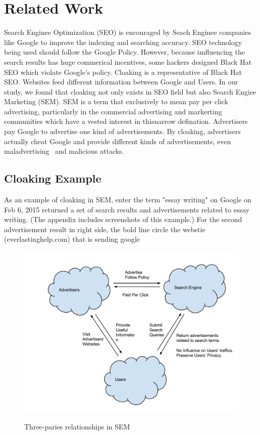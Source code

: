 \section{Related Work}
\label{s:related-work}

Search Enginee Optimization (SEO) is encouraged by Seach Enginee companies like Google to improve the indexing and searching accuracy. SEO technology being used should follow the Google Policy. However, because imfluencing the search results has huge commerical incentives, some hackers designed Black Hat SEO which violate Google's policy. Cloaking is a representative of Black Hat SEO. Websites feed different information between Google and Users. In our study, we found that cloaking not only exists in SEO field but also Search Engiee Marketing (SEM). SEM is a term that exclusively to mean pay per click advertising, particularly in the commercial advertising and markerting communities which have a vested interest in thisnarrow defination. Advertisers pay Google to advertise one kind of advertisements. By cloaking, advertisers actually cheat Google and provide different kinds of advertisements, even maladvertising~\cite{Li:2012:KYE:2382196.2382267} and malicious attacks. 

\subsection{Cloaking Example}
As an example of cloaking in SEM, enter the term "essay writing" on Google on Feb 6, 2015 returned a set of search results and advertisements related to essay writing. (The appendix includes screenshots of this example.) For the second advertisement result in right side, the bold line circle the webstie (everlastinghelp.com) that is sending google 


\begin{figure}[t]
	\centering
	\includegraphics[width=.5\textwidth]{fig/three-parties}
	\label{fig:sem-model}
	\caption{Three-paries relationships in SEM}
\end{figure}

